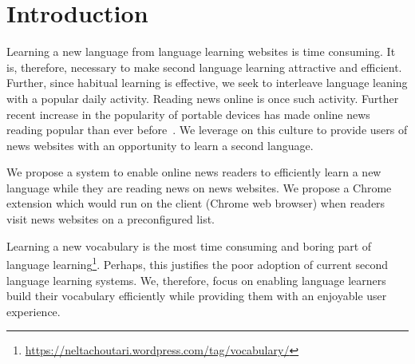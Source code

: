 \section{Introduction}
Learning a new language from language learning websites is 
time consuming. It is, therefore, necessary to make second 
language learning attractive and efficient. Further, since habitual 
learning is effective, we seek to interleave language leaning with 
a popular daily activity. Reading news online is once such 
activity. 
Further recent increase in the popularity of 
portable devices has made online news reading popular than ever 
before~\cite{yarlh2012}. We leverage on this culture to provide 
users of news websites with an opportunity to learn a second 
language.

We propose a system to enable online news readers to efficiently learn 
a new language while they are reading news on news websites. We propose 
a Chrome extension which would run on the client (Chrome web browser) 
when readers visit news websites on a preconfigured list.

Learning a new vocabulary is the most time consuming and boring part of 
language learning\footnote{\url{https://neltachoutari.wordpress.com/tag/vocabulary/}}. 
Perhaps, this justifies the poor adoption of current second language learning 
systems. We, therefore, focus on enabling language learners build their vocabulary 
efficiently while providing them with an enjoyable user experience.